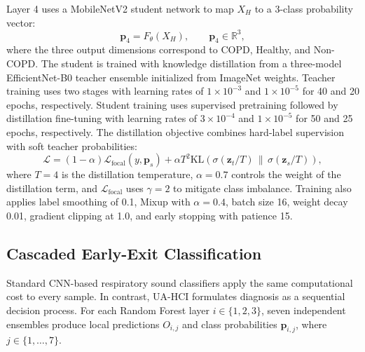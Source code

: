 Layer 4 uses a MobileNetV2 student network to map $X_H$ to a 3-class probability vector:
\begin{equation}
    \mathbf{p}_4 = F_{\theta}(X_H), \qquad \mathbf{p}_4 \in \mathbb{R}^{3},
\end{equation}
where the three output dimensions correspond to COPD, Healthy, and Non-COPD. The student is trained with knowledge distillation from a three-model EfficientNet-B0 teacher ensemble initialized from ImageNet weights. Teacher training uses two stages with learning rates of $1\times10^{-3}$ and $1\times10^{-5}$ for 40 and 20 epochs, respectively. Student training uses supervised pretraining followed by distillation fine-tuning with learning rates of $3\times10^{-4}$ and $1\times10^{-5}$ for 50 and 25 epochs, respectively. The distillation objective combines hard-label supervision with soft teacher probabilities:
\begin{equation}
\mathcal{L}=(1-\alpha)\mathcal{L}_{\mathrm{focal}}(y,\mathbf{p}_s)+\alpha T^2\mathrm{KL}\left(\sigma(\mathbf{z}_t/T)\,\|\,\sigma(\mathbf{z}_s/T)\right),
\end{equation}
where $T=4$ is the distillation temperature, $\alpha=0.7$ controls the weight of the distillation term, and $\mathcal{L}_{\mathrm{focal}}$ uses $\gamma=2$ to mitigate class imbalance. Training also applies label smoothing of 0.1, Mixup with $\alpha=0.4$, batch size 16, weight decay 0.01, gradient clipping at 1.0, and early stopping with patience 15.

\subsection{Cascaded Early-Exit Classification}
\label{subsec:architecture}
Standard CNN-based respiratory sound classifiers apply the same computational cost to every sample. In contrast, UA-HCI formulates diagnosis as a sequential decision process. For each Random Forest layer $i\in\{1,2,3\}$, seven independent ensembles produce local predictions $O_{i,j}$ and class probabilities $\mathbf{p}_{i,j}$, where $j\in\{1,\ldots,7\}$.

